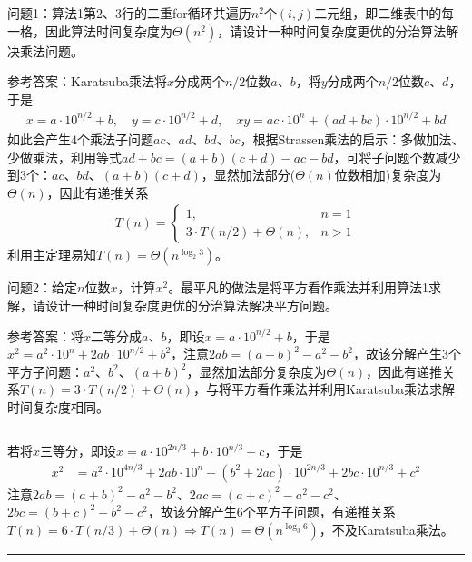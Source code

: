 \documentclass{ctexart}
\begin{document}
问题1：算法1第2、3行的二重for循环共遍历$n^2$个$(i,j)$二元组，即二维表中的每一格，因此算法时间复杂度为$\Theta(n^2)$，请设计一种时间复杂度更优的分治算法解决乘法问题。

参考答案：Karatsuba乘法将$x$分成两个$n/2$位数$a$、$b$，将$y$分成两个$n/2$位数$c$、$d$，于是
\begin{align*}
    x = a \cdot 10^{n/2} + b, \quad y = c \cdot 10^{n/2} + d, \quad xy = ac \cdot 10^n + (ad+bc) \cdot 10^{n/2} + bd
\end{align*}
如此会产生$4$个乘法子问题$ac$、$ad$、$bd$、$bc$，根据Strassen乘法的启示：多做加法、少做乘法，利用等式$ad+bc = (a+b)(c+d) - ac - bd$，可将子问题个数减少到$3$个：$ac$、$bd$、$(a+b)(c+d)$，显然加法部分($\Theta(n)$位数相加)复杂度为$\Theta(n)$，因此有递推关系
\begin{align*}
    T(n) = \begin{cases}
               1, & n = 1 \\ 3 \cdot T(n/2) + \Theta(n), & n > 1
           \end{cases}
\end{align*}
利用主定理易知$T(n) = \Theta(n^{\log_2 3})$。

问题2：给定$n$位数$x$，计算$x^2$。最平凡的做法是将平方看作乘法并利用算法1求解，请设计一种时间复杂度更优的分治算法解决平方问题。

参考答案：将$x$二等分成$a$、$b$，即设$x = a \cdot 10^{n/2} + b$，于是$x^2 = a^2 \cdot 10^n + 2ab \cdot 10^{n/2} + b^2$，注意$2ab = (a+b)^2 - a^2 - b^2$，故该分解产生$3$个平方子问题：$a^2$、$b^2$、$(a+b)^2$，显然加法部分复杂度为$\Theta(n)$，因此有递推关系$T(n) = 3 \cdot T(n/2) + \Theta(n)$，与将平方看作乘法并利用Karatsuba乘法求解时间复杂度相同。

\noindent\rule{\textwidth}{0.4pt}

若将$x$三等分，即设$x = a \cdot 10^{2n/3} + b \cdot 10^{n/3} + c$，于是
\begin{align*}
    x^2 & = a^2 \cdot 10^{4n/3} + 2 ab \cdot 10^n + (b^2 + 2ac) \cdot 10^{2n/3} + 2bc \cdot 10^{n/3} + c^2
\end{align*}
注意$2ab = (a+b)^2 - a^2 - b^2$、$2ac = (a+c)^2 - a^2 - c^2$、$2bc = (b+c)^2 - b^2 - c^2$，故该分解产生$6$个平方子问题，有递推关系$T(n) = 6 \cdot T(n/3) + \Theta(n) \Longrightarrow T(n) = \Theta(n^{\log_3 6})$，不及Karatsuba乘法。

\noindent\rule{\textwidth}{0.4pt}
\end{document}

